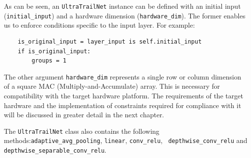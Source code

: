 \documentclass[11pt,a4paper, open=any]{scrbook}
\newcounter{constraint}[chapter]
\newcommand{\py}[1]{\texttt{#1}}
\begin{document}
As can be seen, an \py{UltraTrailNet} instance can be defined with an initial input (\py{initial_input}) and a hardware dimension (\py{hardware_dim}). The former enables us to enforce conditions specific to the input layer. For example:

\begin{verbatim}
	is_original_input = layer_input is self.initial_input
	if is_original_input:
		groups = 1
\end{verbatim}

The other argument \py{hardware_dim} represents a single row or column dimension of a square MAC (Multiply-and-Accumulate) array. This is necessary for compatibility with the target hardware platform. The requirements of the target hardware and the implementation of constraints required for compliance with it will be discussed in greater detail in the next chapter.

The \py{UltraTrailNet} class also contains the following methods:\py{adaptive_avg_pooling}, \py{linear}, \py{conv_relu}, \py{ depthwise_conv_relu} and\\ \py{depthwise_separable_conv_relu}.
\end{document}
